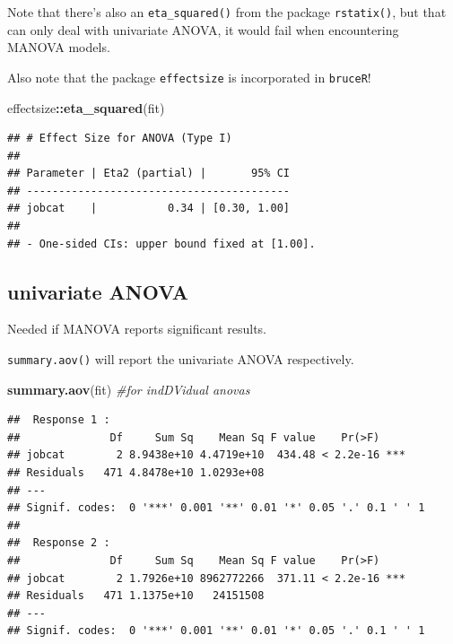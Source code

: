 \documentclass[
]{ctexart}
\newenvironment{Shaded}{\begin{snugshade}}{\end{snugshade}}
\newcommand{\CommentTok}[1]{\textcolor[rgb]{0.56,0.35,0.01}{\textit{#1}}}
\newcommand{\FunctionTok}[1]{\textcolor[rgb]{0.13,0.29,0.53}{\textbf{#1}}}
\newcommand{\NormalTok}[1]{#1}
\newcommand{\SpecialCharTok}[1]{\textcolor[rgb]{0.81,0.36,0.00}{\textbf{#1}}}
\begin{document}
Note that there's also an \texttt{eta\_squared()} from the package
\texttt{rstatix()}, but that can only deal with univariate ANOVA, it
would fail when encountering MANOVA models.

Also note that the package \texttt{effectsize} is incorporated in
\texttt{bruceR}!

\begin{Shaded}
\begin{Highlighting}[]
\NormalTok{effectsize}\SpecialCharTok{::}\FunctionTok{eta\_squared}\NormalTok{(fit)}
\end{Highlighting}
\end{Shaded}

\begin{verbatim}
## # Effect Size for ANOVA (Type I)
## 
## Parameter | Eta2 (partial) |       95% CI
## -----------------------------------------
## jobcat    |           0.34 | [0.30, 1.00]
## 
## - One-sided CIs: upper bound fixed at [1.00].
\end{verbatim}

\hypertarget{univariate-anova}{%
\subsection{univariate ANOVA}\label{univariate-anova}}

Needed if MANOVA reports significant results.

\texttt{summary.aov()} will report the univariate ANOVA respectively.

\begin{Shaded}
\begin{Highlighting}[]
\FunctionTok{summary.aov}\NormalTok{(fit)  }\CommentTok{\#for indDVidual anovas}
\end{Highlighting}
\end{Shaded}

\begin{verbatim}
##  Response 1 :
##              Df     Sum Sq    Mean Sq F value    Pr(>F)    
## jobcat        2 8.9438e+10 4.4719e+10  434.48 < 2.2e-16 ***
## Residuals   471 4.8478e+10 1.0293e+08                      
## ---
## Signif. codes:  0 '***' 0.001 '**' 0.01 '*' 0.05 '.' 0.1 ' ' 1
## 
##  Response 2 :
##              Df     Sum Sq    Mean Sq F value    Pr(>F)    
## jobcat        2 1.7926e+10 8962772266  371.11 < 2.2e-16 ***
## Residuals   471 1.1375e+10   24151508                      
## ---
## Signif. codes:  0 '***' 0.001 '**' 0.01 '*' 0.05 '.' 0.1 ' ' 1
\end{verbatim}
\end{document}
